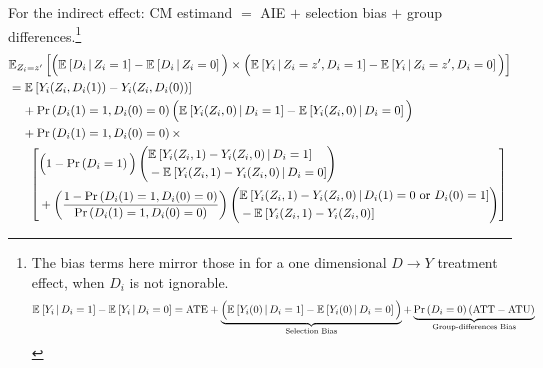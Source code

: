 \noindent
For the indirect effect: CM estimand $=$ AIE $+$ selection bias $+$ group differences.\footnote{
    The bias terms here mirror those in \cite{heckman1998characterizing,angrist2009mostly} for a one dimensional $D\to Y$ treatment effect, when $D_i$ is not ignorable.
    \[ \Egiven{ Y_i}{D_i =1} - \Egiven{ Y_i}{D_i =0}
        = \text{ATE}
        + \underbrace{\Big( \Egiven{ Y_i(0)}{D_i =1} - \Egiven{ Y_i(0)}{D_i =0} \Big)}_{
            \text{Selection Bias}}
        + \underbrace{ \Prob{D_i=0} (\text{ATT}- \text{ATU}) }_{
            \text{Group-differences Bias}} \]
}
\begin{align*}
    &\E[Z_i = z']{
        \Big( \Egiven{D_i}{Z_i = 1} - \Egiven{D_i}{Z_i = 0} \Big) \times
        \Big( \Egiven{Y_i}{Z_i = z', D_i = 1} - \Egiven{Y_i}{Z_i = z', D_i = 0} \Big) } \\
    & = \E{Y_i(Z_i, D_i(1)) - Y_i(Z_i, D_i(0))} \\
    & \;\;\;\; + \Prob{D_i(1) = 1, D_i(0) = 0} \Big(
        \Egiven{Y_i(Z_i, 0)}{D_i = 1} - \Egiven{Y_i(Z_i, 0)}{D_i = 0} \Big) \\
    & \;\;\;\; + \Prob{D_i(1) = 1, D_i(0) = 0} \times \\
    & \;\;\;\; \;\; \left[ \begin{aligned}
        &\Big( 1 - \Prob{D_i=1} \Big)
        \left( \begin{aligned}
            &\Egiven{Y_i(Z_i, 1) - Y_i(Z_i, 0)}{D_i = 1} \\ 
            &  - \Egiven{Y_i(Z_i, 1) - Y_i(Z_i, 0)}{D_i = 0}
        \end{aligned} \right) \\
        &+ \left( \frac{1 - \Prob{D_i(1) = 1, D_i(0) = 0} }{
            \Prob{D_i(1) = 1, D_i(0) = 0}} \right)
        \left( \begin{aligned}
            &\Egiven{Y_i(Z_i, 1) - Y_i(Z_i, 0)}{D_i(1) = 0 \text{ or } D_i(0)=1} \\ 
            &  - \E{Y_i(Z_i, 1) - Y_i(Z_i, 0)}
        \end{aligned} \right)
    \end{aligned} \right]
\end{align*}

